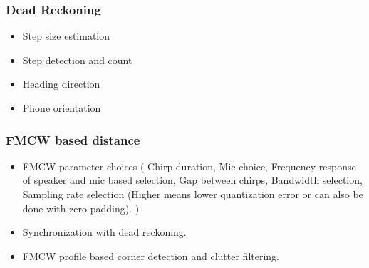 \begin{figure}[h!t]
\end{figure}

\subsubsection{Dead Reckoning}
\begin{itemize}
\item Step size estimation
\item Step detection and count
\item Heading direction
\item Phone orientation
\end{itemize}

\subsubsection{FMCW based distance}
\begin{itemize}
\item FMCW parameter choices ( Chirp duration, Mic choice, Frequency response of speaker and mic based selection, Gap between chirps, Bandwidth selection, Sampling rate selection (Higher means lower quantization error or can also be done with zero padding). )
\item Synchronization with dead reckoning.
\item FMCW profile based corner detection and clutter filtering.
\end{itemize}

